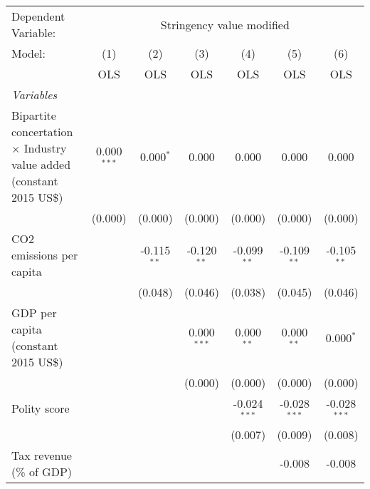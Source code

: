 
\begingroup
\centering
\begin{tabular}{lcccccc}
   \toprule
   Dependent Variable: & \multicolumn{6}{c}{Stringency value modified}\\
   Model:                                                                      & (1)           & (2)           & (3)           & (4)            & (5)            & (6)\\  
                                                                               &  OLS          & OLS           & OLS           & OLS            & OLS            & OLS\\  
   \midrule
   \emph{Variables}\\
   Bipartite concertation $\times$ Industry value added (constant 2015 US\$)   & 0.000$^{***}$ & 0.000$^{*}$   & 0.000         & 0.000          & 0.000          & 0.000\\   
                                                                               & (0.000)       & (0.000)       & (0.000)       & (0.000)        & (0.000)        & (0.000)\\   
   CO2 emissions per capita                                                    &               & -0.115$^{**}$ & -0.120$^{**}$ & -0.099$^{**}$  & -0.109$^{**}$  & -0.105$^{**}$\\   
                                                                               &               & (0.048)       & (0.046)       & (0.038)        & (0.045)        & (0.046)\\   
   GDP per capita (constant 2015 US\$)                                         &               &               & 0.000$^{***}$ & 0.000$^{**}$   & 0.000$^{**}$   & 0.000$^{*}$\\   
                                                                               &               &               & (0.000)       & (0.000)        & (0.000)        & (0.000)\\   
   Polity score                                                                &               &               &               & -0.024$^{***}$ & -0.028$^{***}$ & -0.028$^{***}$\\   
                                                                               &               &               &               & (0.007)        & (0.009)        & (0.008)\\   
   Tax revenue (\% of GDP)                                                     &               &               &               &                & -0.008         & -0.008\\   

\end{tabular}
